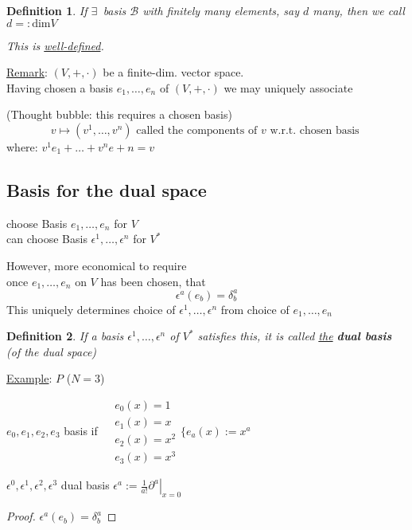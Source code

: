 \documentclass[10pt, twoside]{amsart}
\newtheorem{definition}{Definition}
\begin{document}
\begin{multicols*}{2}
\begin{definition}
  If $\exists \, $ basis $\mathcal{B}$ with finitely many elements, say $d$ many, then we call $d =:\text{dim}{V}$

This is \underline{well-defined}.
\end{definition}

\underline{Remark}: $(V,+,\cdot)$ be a finite-dim. vector space.   \\
Having chosen a basis $e_1, \dots, e_n$ of $(V,+,\cdot)$ we may uniquely associate

(Thought bubble: this requires a chosen basis)
\[
v \mapsto (v^1 , \dots , v^n)  \text{ called the components of $v$ w.r.t. chosen basis }
\]
where: $v^1 e_1 + \dots + v^n e+n = v$

\subsection{Basis for the dual space}

choose Basis $e_1, \dots, e_n$ for $V$ \\
can choose Basis $\epsilon^1, \dots , \epsilon^n$ for $V^*$

However, more economical to require \\
once $e_1 , \dots , e_n$ on $V$ has been chosen, that
\[
\epsilon^a(e_b) = \delta^a_b
\]
This uniquely determines choice of $\epsilon^1, \dots , \epsilon^n$ from choice of $e_1, \dots , e_n$

\begin{definition}
  If a basis $\epsilon^1, \dots , \epsilon^n$ of $V^*$ satisfies this, it is called \underline{the} \textbf{dual basis} (of the dual space)
\end{definition}

\underline{Example}: $P$ ($N=3$)

$e_0, e_1, e_2, e_3$ basis if $\begin{aligned} & e_0(x) = 1 \\ 
 & e_1(x) = x \\ 
  & e_2(x) = x^2 \\ 
  & e_3(x) = x^3 \end{aligned} \lbrace e_a(x):=x^a$

$\epsilon^0, \epsilon^1, \epsilon^2, \epsilon^3$ dual basis $\epsilon^a := \frac{1}{a!} \left. \partial^a \right|_{x=0}$

\begin{proof}
  $\epsilon^a(e_b) = \delta^a_b$
\end{proof}


\end{multicols*}
\end{document}
